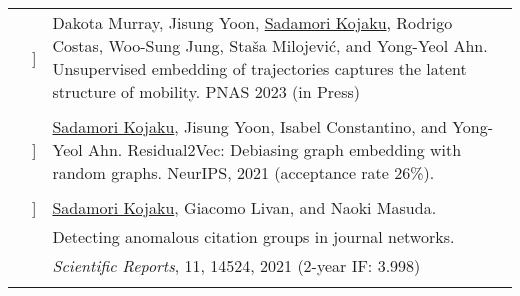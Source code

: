 \documentclass[letterpaper, 11pt]{article}
\newcounter{papercount}
\newcounter{papertype}
\newcommand{\paperitem}{%
\stepcounter{papercount}%
{\color{OliveGreen}{[\Alph{papertype}\thepapercount}]}
}
\begin{document}
\begin{longtable}{p{1.3in}p{2em}p{5.5in}}
                                                    &\paperitem & Dakota Murray, Jisung Yoon, \underline{Sadamori Kojaku}, Rodrigo Costas, Woo-Sung Jung, Sta\v{s}a Milojevi\'{c}, and Yong-Yeol Ahn.
                                                    Unsupervised embedding of trajectories captures the latent structure of mobility. PNAS 2023 (in Press) \\
                                                    & \\
                                                    &\paperitem & \underline{Sadamori Kojaku}, Jisung Yoon, Isabel Constantino, and Yong-Yeol Ahn.
                                                    Residual2Vec: Debiasing graph embedding with random graphs. NeurIPS, 2021 (acceptance rate 26\%). \\
                                                    & \\
                                                    & \paperitem & \underline{Sadamori Kojaku}, Giacomo Livan, and Naoki Masuda.\\
                                                    & & Detecting anomalous citation groups in journal networks. \\
                                                    & & \textit{Scientific Reports}, 11, 14524, 2021 (2-year IF: 3.998)\\
                                                    & \\


\end{longtable}
\end{document}

